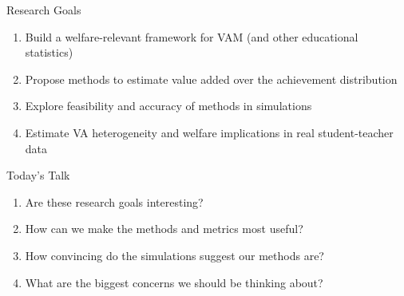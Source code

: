 \documentclass[t,aspectratio=169,11pt]{beamer}
\begin{document}
\begin{frame}{Research Goals}

\begin{enumerate}
     \item Build a welfare-relevant framework for VAM (and other educational statistics) 
    \item Propose methods to estimate value added over the achievement distribution
    \item Explore feasibility and accuracy of methods in simulations
    \item Estimate VA heterogeneity and welfare implications in real student-teacher data
\end{enumerate}
\end{frame}

\begin{frame}{Today's Talk}

\begin{enumerate}
    \item Are these research goals interesting?
    \item How can we make the methods and metrics most useful? 
    \item How convincing do the simulations suggest our methods are?
    \item What are the biggest concerns we should be thinking about?
\end{enumerate}
\end{frame}
\end{document}
